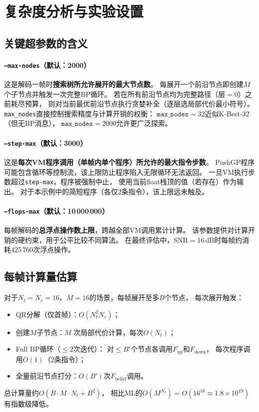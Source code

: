\documentclass[12pt, a4paper]{ctexart}
\begin{document}
\section{复杂度分析与实验设置}
\label{sec:complexity}

\subsection{关键超参数的含义}

\paragraph{\texttt{--max-nodes}（默认：2000）}
这是解码一帧时\textbf{搜索树所允许展开的最大节点数}。
每展开一个前沿节点即创建$M$个子节点并触发一次完整BP循环。
若在所有前沿节点均为完整路径（层$=$0）之前耗尽预算，
则对当前最优前沿节点执行贪婪补全（逐层选局部代价最小符号）。
\texttt{max\_nodes}直接控制搜索精度与计算开销的权衡：
$\texttt{max\_nodes}=32$近似K-Best-32（但无BP消息），
$\texttt{max\_nodes}=2000$允许更广泛探索。

\paragraph{\texttt{--step-max}（默认：3000）}
这是\textbf{每次VM程序调用（单帧内单个程序）所允许的最大指令步数}。
PushGP程序可能包含循环等控制流，该上限防止程序陷入无限循环无法返回。
一旦VM执行步数超过\texttt{step-max}，程序被强制中止，
使用当前float栈顶的值（若存在）作为输出。
对于本示例中的简短程序（各仅2条指令），该上限远未触及。

\paragraph{\texttt{--flops-max}（默认：10\,000\,000）}
每帧解码的\textbf{总浮点操作数上限}，跨越全部VM调用累计计算。
该参数提供对计算开销的硬约束，用于公平比较不同算法。
在最终评估中，SNR$=$16\,dB时每帧约消耗425\,760次浮点操作。

\subsection{每帧计算量估算}

对于$N_t=N_r=16$、$M=16$的场景，每帧展开至多$B$个节点，
每次展开触发：
\begin{itemize}[leftmargin=2em]
  \item QR分解（仅首帧）：$O(N_t^2 N_r)$；
  \item 创建$M$子节点：$M$ 次局部代价计算，每次$O(N_t)$；
  \item Full BP循环（$\leq2$次迭代）：
        对$\leq B'$个节点各调用$F_{\mathrm{up}}$和$F_{\mathrm{down}}$，
        每次程序调用$O(1)$（2条指令）；
  \item 全量前沿节点打分：$O(B')$次$F_{\mathrm{belief}}$调用。
\end{itemize}
总计算量约$O(B\cdot M\cdot N_t + B^2)$，
相比ML的$O(M^{N_t})=O(16^{16}\approx1.8\times10^{19})$有指数级降低。
\end{document}

